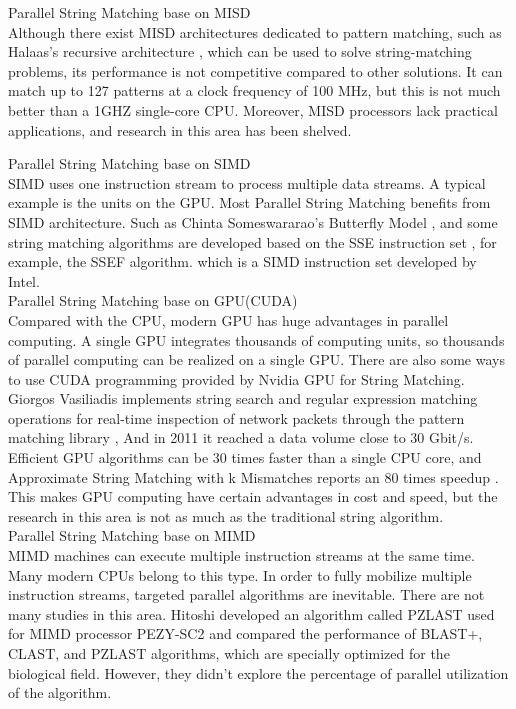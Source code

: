 \documentclass[11pt]{article}       %
\begin{document}
Parallel String Matching base on MISD\\
Although there exist MISD architectures dedicated to pattern matching, such as Halaas's recursive architecture \cite{MISD}, which can be used to solve string-matching problems, its performance is not competitive compared to other solutions. It can match up to 127 patterns at a clock frequency of 100 MHz, but this is not much better than a 1GHZ single-core CPU. Moreover, MISD processors lack practical applications, and research in this area has been shelved.


Parallel String Matching base on SIMD\\
SIMD uses one instruction stream to process multiple data streams. A typical example is the units on the GPU. Most Parallel String Matching benefits from SIMD architecture. Such as Chinta Someswararao's Butterfly Model \cite{Butterfly}, and some string matching algorithms are developed based on the SSE instruction set \cite{Matching}, for example, the SSEF algorithm. which is a SIMD instruction set developed by Intel. \\

Parallel String Matching base on GPU(CUDA)\\
Compared with the CPU, modern GPU has huge advantages in parallel computing. A single GPU integrates thousands of computing units, so thousands of parallel computing can be realized on a single GPU. There are also some ways to use CUDA programming provided by Nvidia GPU for String Matching. Giorgos Vasiliadis implements string search and regular expression matching operations for real-time inspection of network packets through the pattern matching library \cite{Bit-Parallel}, And in 2011 it reached a data volume close to 30 Gbit/s. Efficient GPU algorithms can be 30 times faster than a single CPU core, and Approximate String Matching with k Mismatches reports an 80 times speedup \cite{pattern-matching}. This makes GPU computing have certain advantages in cost and speed, but the research in this area is not as much as the traditional string algorithm. \\


Parallel String Matching base on MIMD\\
MIMD machines can execute multiple instruction streams at the same time. Many modern CPUs belong to this type. In order to fully mobilize multiple instruction streams, targeted parallel algorithms are inevitable. There are not many studies in this area. Hitoshi developed an algorithm called PZLAST used for MIMD processor PEZY-SC2 and compared the performance of BLAST+, CLAST, and PZLAST algorithms\cite{MIMD}, which are specially optimized for the biological field. However, they didn't explore the percentage of parallel utilization of the algorithm.\\
\end{document}
